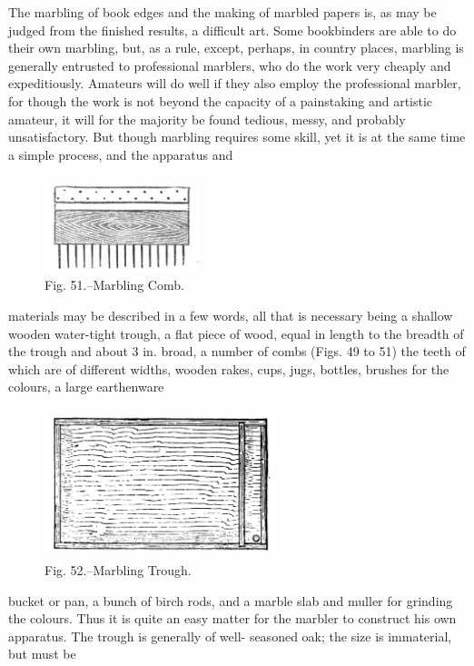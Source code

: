 \documentclass[twoside]{book}
\begin{document}
The marbling of book edges and the making of
marbled papers is, as may be judged from the
finished results, a difficult art. Some bookbinders
are able to do their own marbling, but, as a rule,
except, perhaps, in country places, marbling is
generally entrusted to professional marblers, who
do the work very cheaply and expeditiously.
Amateurs will do well if they also employ the
professional marbler, for though the work is not
beyond the capacity of a painstaking and artistic
amateur, it will for the majority be found tedious,
\pagebreak
messy, and probably unsatisfactory. But though
marbling requires some skill, yet it is at the same
time a simple process, and the apparatus and
	\begin{figure}[h]
		\centering
		\includegraphics[width=0.4\textwidth]{Figures/_051.png}
		\caption*{Fig. 51.--Marbling Comb.}
	\end{figure}
materials may be described in a few words, all that
is necessary being a shallow wooden water-tight
trough, a flat piece of wood, equal in length to the
breadth of the trough and about 3 in. broad, a
number of combs (Figs. 49 to 51) the teeth of which
are of different widths, wooden rakes, cups, jugs,
bottles, brushes for the colours, a large earthenware
	\begin{figure}[h]
		\centering
		\includegraphics[width=0.6\textwidth]{Figures/_052.png}
		\caption*{Fig. 52.--Marbling Trough.}
	\end{figure}
bucket or pan, a bunch of birch rods, and a marble
slab and muller for grinding the colours. Thus it
is quite an easy matter for the marbler to construct
his own apparatus. The trough is generally of well-
\pagebreak
seasoned oak; the size is immaterial, but must be
\end{document}
